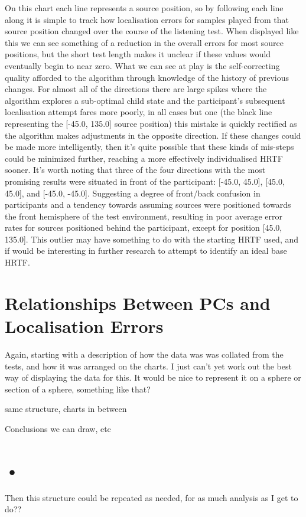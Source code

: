 On this chart each line represents a source position, so by following each line along it is simple to track how localisation errors for samples played from that source position changed over the course of the listening test. When displayed like this we can see something of a reduction in the overall errors for most source positions, but the short test length makes it unclear if these values would eventually begin to near zero. What we can see at play is the self-correcting quality afforded to the algorithm through knowledge of the history of previous changes. For almost all of the directions there are large spikes where the algorithm explores a sub-optimal child state and the participant's subsequent localisation attempt fares more poorly, in all cases but one (the black line representing the [-45.0, 135.0] source position) this mistake is quickly rectified as the algorithm makes adjustments in the opposite direction. If these changes could be made more intelligently, then it's quite possible that these kinds of mis-steps could be minimized further, reaching a more effectively individualised HRTF sooner. It's worth noting that three of the four directions with the most promising results were situated in front of the participant: [-45.0, 45.0], [45.0, 45.0], and [-45.0, -45.0]. Suggesting a degree of front/back confusion in participants and a tendency towards assuming sources were positioned towards the front hemisphere of the test environment, resulting in poor average error rates for sources positioned behind the participant, except for position [45.0, 135.0]. This outlier may have something to do with the starting HRTF used, and if would be interesting in further research to attempt to identify an ideal base HRTF. 

\section{Relationships Between PCs and Localisation Errors}
Again, starting with a description of how the data was was collated from the tests, and how it was arranged on the charts. I just can't yet work out the best way of displaying the data for this. It would be nice to represent it on a sphere or section of a sphere, something like that? 

\bigskip

same structure, charts in between 

\bigskip 

Conclusions we can draw, etc

\section{•}
Then this structure could be repeated as needed, for as much analysis as I get to do??